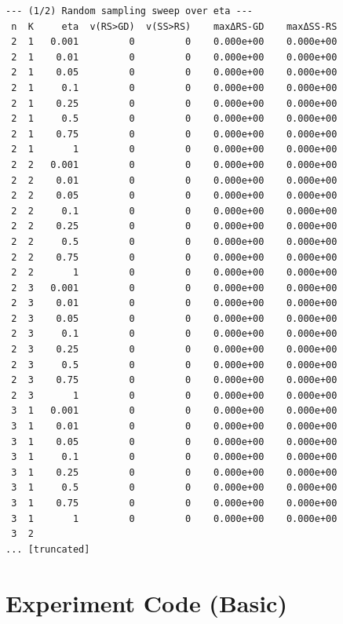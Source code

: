 \documentclass[11pt]{article}
\begin{document}
\begin{lstlisting}
--- (1/2) Random sampling sweep over eta ---
 n  K     eta  v(RS>GD)  v(SS>RS)    maxΔRS-GD    maxΔSS-RS
 2  1   0.001         0         0    0.000e+00    0.000e+00
 2  1    0.01         0         0    0.000e+00    0.000e+00
 2  1    0.05         0         0    0.000e+00    0.000e+00
 2  1     0.1         0         0    0.000e+00    0.000e+00
 2  1    0.25         0         0    0.000e+00    0.000e+00
 2  1     0.5         0         0    0.000e+00    0.000e+00
 2  1    0.75         0         0    0.000e+00    0.000e+00
 2  1       1         0         0    0.000e+00    0.000e+00
 2  2   0.001         0         0    0.000e+00    0.000e+00
 2  2    0.01         0         0    0.000e+00    0.000e+00
 2  2    0.05         0         0    0.000e+00    0.000e+00
 2  2     0.1         0         0    0.000e+00    0.000e+00
 2  2    0.25         0         0    0.000e+00    0.000e+00
 2  2     0.5         0         0    0.000e+00    0.000e+00
 2  2    0.75         0         0    0.000e+00    0.000e+00
 2  2       1         0         0    0.000e+00    0.000e+00
 2  3   0.001         0         0    0.000e+00    0.000e+00
 2  3    0.01         0         0    0.000e+00    0.000e+00
 2  3    0.05         0         0    0.000e+00    0.000e+00
 2  3     0.1         0         0    0.000e+00    0.000e+00
 2  3    0.25         0         0    0.000e+00    0.000e+00
 2  3     0.5         0         0    0.000e+00    0.000e+00
 2  3    0.75         0         0    0.000e+00    0.000e+00
 2  3       1         0         0    0.000e+00    0.000e+00
 3  1   0.001         0         0    0.000e+00    0.000e+00
 3  1    0.01         0         0    0.000e+00    0.000e+00
 3  1    0.05         0         0    0.000e+00    0.000e+00
 3  1     0.1         0         0    0.000e+00    0.000e+00
 3  1    0.25         0         0    0.000e+00    0.000e+00
 3  1     0.5         0         0    0.000e+00    0.000e+00
 3  1    0.75         0         0    0.000e+00    0.000e+00
 3  1       1         0         0    0.000e+00    0.000e+00
 3  2   
... [truncated]
\end{lstlisting}


\section{Experiment Code (Basic)}
\end{document}
